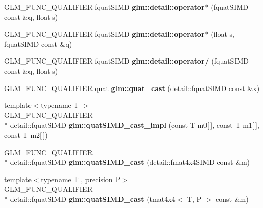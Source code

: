 \begin{DoxyCompactItemize}
\item 
\hypertarget{namespaceglm_1_1detail_a828cc0ad293110da78ec58305e89ac3a}{G\-L\-M\-\_\-\-F\-U\-N\-C\-\_\-\-Q\-U\-A\-L\-I\-F\-I\-E\-R fquat\-S\-I\-M\-D {\bfseries glm\-::detail\-::operator$\ast$} (fquat\-S\-I\-M\-D const \&q, float s)}\label{namespaceglm_1_1detail_a828cc0ad293110da78ec58305e89ac3a}

\item 
\hypertarget{namespaceglm_1_1detail_a586bbba0bf2940cecf9565510005679a}{G\-L\-M\-\_\-\-F\-U\-N\-C\-\_\-\-Q\-U\-A\-L\-I\-F\-I\-E\-R fquat\-S\-I\-M\-D {\bfseries glm\-::detail\-::operator$\ast$} (float s, fquat\-S\-I\-M\-D const \&q)}\label{namespaceglm_1_1detail_a586bbba0bf2940cecf9565510005679a}

\item 
\hypertarget{namespaceglm_1_1detail_a242a463e8c91e55fd54ad6a68016e839}{G\-L\-M\-\_\-\-F\-U\-N\-C\-\_\-\-Q\-U\-A\-L\-I\-F\-I\-E\-R fquat\-S\-I\-M\-D {\bfseries glm\-::detail\-::operator/} (fquat\-S\-I\-M\-D const \&q, float s)}\label{namespaceglm_1_1detail_a242a463e8c91e55fd54ad6a68016e839}

\item 
\hypertarget{namespaceglm_a68af15a87ea3aac558767c9bb2ed141d}{G\-L\-M\-\_\-\-F\-U\-N\-C\-\_\-\-Q\-U\-A\-L\-I\-F\-I\-E\-R quat {\bfseries glm\-::quat\-\_\-cast} (detail\-::fquat\-S\-I\-M\-D const \&x)}\label{namespaceglm_a68af15a87ea3aac558767c9bb2ed141d}

\item 
\hypertarget{namespaceglm_a2e2bb4244525831b56079cdacc87948d}{{\footnotesize template$<$typename T $>$ }\\G\-L\-M\-\_\-\-F\-U\-N\-C\-\_\-\-Q\-U\-A\-L\-I\-F\-I\-E\-R \\*
detail\-::fquat\-S\-I\-M\-D {\bfseries glm\-::quat\-S\-I\-M\-D\-\_\-cast\-\_\-impl} (const T m0\mbox{[}$\,$\mbox{]}, const T m1\mbox{[}$\,$\mbox{]}, const T m2\mbox{[}$\,$\mbox{]})}\label{namespaceglm_a2e2bb4244525831b56079cdacc87948d}

\item 
\hypertarget{namespaceglm_a0c09f4c773ffd14c3d9246a50011cf0c}{G\-L\-M\-\_\-\-F\-U\-N\-C\-\_\-\-Q\-U\-A\-L\-I\-F\-I\-E\-R \\*
detail\-::fquat\-S\-I\-M\-D {\bfseries glm\-::quat\-S\-I\-M\-D\-\_\-cast} (detail\-::fmat4x4\-S\-I\-M\-D const \&m)}\label{namespaceglm_a0c09f4c773ffd14c3d9246a50011cf0c}

\item 
\hypertarget{namespaceglm_a69b23f5cf01145b981cfb276c15813bb}{{\footnotesize template$<$typename T , precision P$>$ }\\G\-L\-M\-\_\-\-F\-U\-N\-C\-\_\-\-Q\-U\-A\-L\-I\-F\-I\-E\-R \\*
detail\-::fquat\-S\-I\-M\-D {\bfseries glm\-::quat\-S\-I\-M\-D\-\_\-cast} (tmat4x4$<$ T, P $>$ const \&m)}\label{namespaceglm_a69b23f5cf01145b981cfb276c15813bb}


\end{DoxyCompactItemize}
